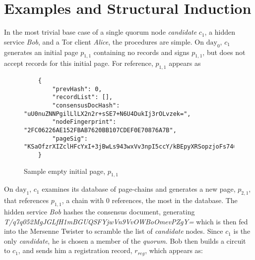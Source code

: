 
\section{Examples and Structural Induction}

In the most trivial base case of a single quorum node \emph{candidate} $ c_{1} $, a hidden service \emph{Bob}, and a Tor client \emph{Alice}, the procedures are simple. On $ \textrm{day}_{0} $, $ c_{1} $ generates an initial page $ p_{1,1} $ containing no records and signs $ p_{1,1} $, but does not accept records for this initial page. For reference, $ p_{1,1} $ appears as 

\begin{figure}
\begin{lstlisting}
	{
		"prevHash": 0,
		"recordList": [],
		"consensusDocHash": "uU0nuZNNPgilLlLX2n2r+sSE7+N6U4DukIj3rOLvzek=",
		"nodeFingerprint": "2FC06226AE152FBAB7620BB107CDEF0E70876A7B",
		"pageSig": "KSaOfzrXIZclHFcYxI+3jBwLs943wxVv3npI5ccY/kBEpyXRSopzjoFs746n0tJqUpdY4Kbe6DBwERaN7ELmSSK9Pu6q8QeKzNAh+QOnKl0fKBN7fqowjkQ3ktFkR0Vuox9WrrbNTMa4+up0Np52hlbKA3zSRz4fbR9NVlh6uuQ="
	}
\end{lstlisting}
\caption{Sample empty initial page, $ p_{1,1} $}
\label{sampleLabel}
\end{figure}

On $ \textrm{day}_{1} $, $ c_{1} $ examines its database of page-chains and generates a new page, $ p_{2,1} $, that references $ p_{1,1} $, a chain with 0 references, the most in the database. The hidden service \emph{Bob} hashes the consensus document, generating \emph{T/q7q052MgJGLfH1mBGUQSFYjwVn9VvOWBoOmevPZgY=} which is then fed into the Mersenne Twister to scramble the list of \emph{candidate} nodes. Since $ c_{1} $ is the only \emph{candidate}, he is chosen a member of the \emph{quorum}. Bob then builds a circuit to $ c_{1} $, and sends him a registration record, $ r_{reg} $, which appears as:

